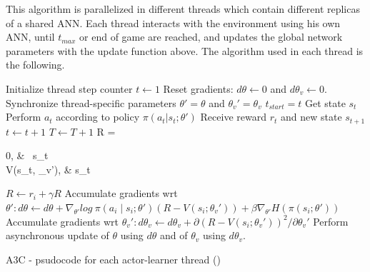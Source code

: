 This algorithm is parallelized in different threads which contain different replicas of a shared \ac{ANN}.
Each thread interacts with the environment using his own \ac{ANN}, until $t_{max}$ or end of game are reached, and updates the
global network parameters with the update function above.
The algorithm used in each thread is the following.

\begin{algorithm}[hbtp]
\begin{algorithmic}
    \State {}
    \State {}
    \State Initialize thread step counter $t \leftarrow 1$
    \Repeat
        \State Reset gradients: $d\theta \leftarrow 0$ and $d\theta_v \leftarrow 0$.
        \State Synchronize thread-specific parameters $\theta' = \theta$ and $\theta_v' = \theta_v$
        \State $t_{start} = t$
        \State Get state $s_t$
        \Repeat
            \State Perform $a_t$ according to policy $\pi(a_t|s_t;\theta')$
            \State Receive reward $r_t$ and new state $s_{t+1}$
            \State $t \leftarrow t + 1$
            \State $T \leftarrow T + 1$
        \State R = \begin{cases}
                0,   & \ s_t \\
                V(s_t, \theta_v'),   &  s_t \;\\
            \end{cases}
            \State $R \leftarrow r_i + \gamma R$
            \State Accumulate gradients wrt $\theta': d\theta \leftarrow d\theta + \nabla_{\theta'} log\:\pi(a_i\mid s_i;\theta')(R-V(s_i;\theta_v'))+\beta\nabla_{\theta'}H(\pi(s_i;\theta'))$
            \State Accumulate gradients wrt $\theta_v': d\theta_v \leftarrow d\theta_v + \partial(R-V(s_i;\theta_v'))^2 / \partial \theta_{v}'$
        \EndFor
        \State Perform asynchronous update of $\theta$ using $d\theta$ and of $\theta_v$ using $d\theta_v$.
\end{algorithmic}
\caption{\acl{A3C} - psudocode for each actor-learner thread (\cite{mnih2016A3C})}
\label{alg:A3C}
\end{algorithm}


